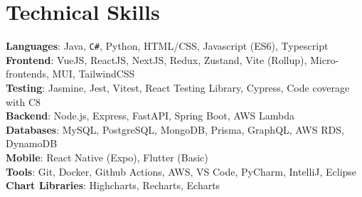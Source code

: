 \documentclass[letterpaper,11pt]{article}
\begin{document}
\section{Technical Skills}
 \begin{itemize}[leftmargin=0.15in, label={}]
    \small{\item{
     \textbf{Languages}{: Java, \texttt{C\#}, Python, HTML/CSS, Javascript (ES6), Typescript} \\
     \textbf{Frontend}{: VueJS, ReactJS, NextJS, Redux, Zustand, Vite (Rollup), Micro-frontends, MUI, TailwindCSS} \\
     \textbf{Testing}{: Jasmine, Jest, Vitest, React Testing Library, Cypress, Code coverage with C8 } \\
     \textbf{Backend}{: Node.js, Express, FastAPI, Spring Boot, AWS Lambda} \\
     \textbf{Databases}{: MySQL, PostgreSQL, MongoDB, Prisma, GraphQL, AWS RDS, DynamoDB} \\
     \textbf{Mobile}{: React Native (Expo), Flutter (Basic)} \\
     \textbf{Tools}{: Git, Docker, Github Actions, AWS, VS Code, PyCharm, IntelliJ, Eclipse} \\
     \textbf{Chart Libraries}{: Highcharts, Recharts, Echarts}
    }}
 \end{itemize}
\end{document}
